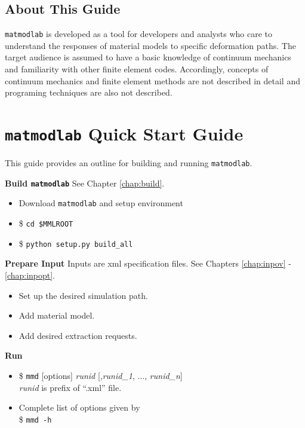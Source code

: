 \documentclass[12pt,report,strict]{SANDreport/SANDreport}
\newcommand{\mml}{\texttt{matmodlab}}
\newcommand{\mmd}{\texttt{mmd}}
\begin{document}
\section{About This Guide}
\label{sec:about}
\mml{} is developed as a tool for developers and analysts who care to
understand the responses of material models to specific deformation paths. The
target audience is assumed to have a basic knowledge of continuum mechanics
and familiarity with other finite element codes.  Accordingly, concepts of
continuum mechanics and finite element methods are not described in detail and
programing techniques are also not described.

\chapter{\mml{} Quick Start Guide}
\label{chap:quick}
This guide provides an outline for building and running \mml{}.

\textbf{Build \mml{}} See Chapter \ref{chap:build}.
\begin{itemize}
  \item Download \mml{} and setup environment
  \item \$ \verb|cd $MMLROOT|
  \item \$ \verb|python setup.py build_all|
\end{itemize}

\textbf{Prepare Input} Inputs are xml specification files. See Chapters
\ref{chap:inpov} - \ref{chap:inpopt}.
\begin{itemize}
  \item Set up the desired simulation path.
  \item Add material model.
  \item Add desired extraction requests.
\end{itemize}

\textbf{Run}
\begin{itemize}
  \item \$ \mmd{} [options] \emph{runid} [,\emph{runid\_1}, $\ldots$,
  \emph{runid\_n}]\\
  \emph{runid} is prefix of ``.xml'' file.
  \item Complete list of options given by \\ \$ \texttt{mmd -h}
\end{itemize}
\end{document}
